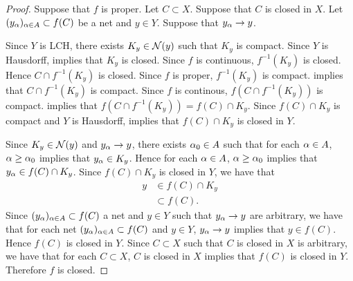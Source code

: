 \documentclass{book}
\begin{document}
\begin{proof}
	Suppose that $f$ is proper. Let $C \subset X$. Suppose that $C$ is closed in $X$. Let $(y_{\alpha})_{\alpha \in A} \subset f(C)$ be a net and $y \in Y$. Suppose that $y_{\alpha} \rightarrow y$. 
	
	Since $Y$ is LCH, there exists $K_y \in \mathcal{N}(y)$ such that $K_y$ is compact. Since $Y$ is Hausdorff,  implies that $K_y$ is closed. Since $f$ is continuous, $f^{-1}(K_y)$ is closed. Hence $C \cap f^{-1}(K_y)$ is closed. Since $f$ is proper, $f^{-1}(K_y)$ is compact.  implies that $C \cap f^{-1}(K_y)$ is compact. Since $f$ is continous, $f(C \cap f^{-1}(K_y))$ is compact.  implies that $f(C \cap f^{-1}(K_y)) = f(C) \cap K_y$. Since $f(C) \cap K_y$ is compact and $Y$ is Hausdorff,  implies that $f(C) \cap K_y$ is closed in $Y$.
	
	Since $K_y \in \mathcal{N}(y)$ and $y_{\alpha} \rightarrow y$, there exists $\alpha_0 \in A$ such that for each $\alpha \in A$, $\alpha \geq \alpha_0$ implies that $y_{\alpha} \in K_y$. Hence for each $\alpha \in A$, $\alpha \geq \alpha_0$ implies that $y_{\alpha} \in f(C) \cap K_y$. Since $f(C) \cap K_y$ is closed in $Y$, we have that
	\begin{align*}
		y 
		& \in f(C) \cap K_y \\
		& \subset f(C).
	\end{align*}
	Since $(y_{\alpha})_{\alpha \in A} \subset f(C)$ a net and $y \in Y$ such that $y_{\alpha} \rightarrow y$ are arbitrary, we have that for each net $(y_{\alpha})_{\alpha \in A} \subset f(C)$ and $y \in Y$,  $y_{\alpha} \rightarrow y$ implies that $y \in f(C)$. Hence $f(C)$ is closed in $Y$. Since $C \subset X$ such that $C$ is closed in $X$ is arbitrary, we have that for each $C \subset X$, $C$ is closed in $X$ implies that $f(C)$ is closed in $Y$. Therefore $f$ is closed.  
\end{proof}
	
	
	
	
	
	
	
	
	
	
	
	
	
	
	
	
	
	
	
	
	
	
	
	
	
	
	
\end{document}
